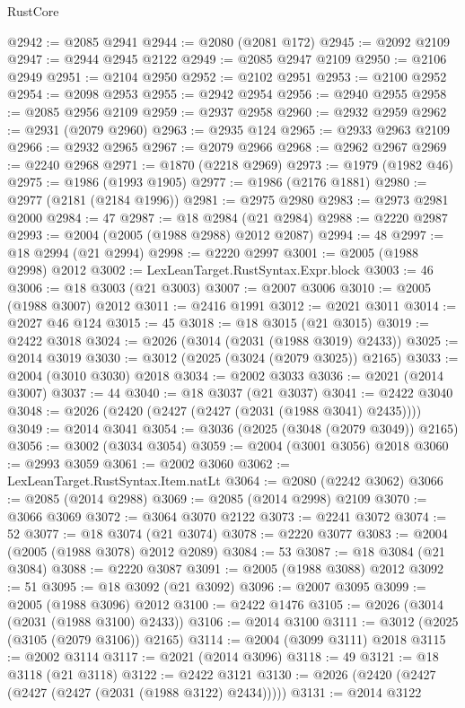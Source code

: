 \begin{lexlean}{RustCore}
\begin{coremodule}
@2942 := @2085 @2941
@2944 := @2080 (@2081 @172)
@2945 := @2092 @2109
@2947 := @2944 @2945 @2122
@2949 := @2085 @2947 @2109
@2950 := @2106 @2949
@2951 := @2104 @2950
@2952 := @2102 @2951
@2953 := @2100 @2952
@2954 := @2098 @2953
@2955 := @2942 @2954
@2956 := @2940 @2955
@2958 := @2085 @2956 @2109
@2959 := @2937 @2958
@2960 := @2932 @2959
@2962 := @2931 (@2079 @2960)
@2963 := @2935 @124
@2965 := @2933 @2963 @2109
@2966 := @2932 @2965
@2967 := @2079 @2966
@2968 := @2962 @2967
@2969 := @2240 @2968
@2971 := @1870 (@2218 @2969)
@2973 := @1979 (@1982 @46)
@2975 := @1986 (@1993 @1905)
@2977 := @1986 (@2176 @1881)
@2980 := @2977 (@2181 (@2184 @1996))
@2981 := @2975 @2980
@2983 := @2973 @2981 @2000
@2984 := 47
@2987 := @18 @2984 (@21 @2984)
@2988 := @2220 @2987
@2993 := @2004 (@2005 (@1988 @2988) @2012 @2087)
@2994 := 48
@2997 := @18 @2994 (@21 @2994)
@2998 := @2220 @2997
@3001 := @2005 (@1988 @2998) @2012
@3002 := LexLeanTarget.RustSyntax.Expr.block
@3003 := 46
@3006 := @18 @3003 (@21 @3003)
@3007 := @2007 @3006
@3010 := @2005 (@1988 @3007) @2012
@3011 := @2416 @1991
@3012 := @2021 @3011
@3014 := @2027 @46 @124
@3015 := 45
@3018 := @18 @3015 (@21 @3015)
@3019 := @2422 @3018
@3024 := @2026 (@3014 (@2031 (@1988 @3019) @2433))
@3025 := @2014 @3019
@3030 := @3012 (@2025 (@3024 (@2079 @3025)) @2165)
@3033 := @2004 (@3010 @3030) @2018
@3034 := @2002 @3033
@3036 := @2021 (@2014 @3007)
@3037 := 44
@3040 := @18 @3037 (@21 @3037)
@3041 := @2422 @3040
@3048 := @2026 (@2420 (@2427 (@2427 (@2031 (@1988 @3041) @2435))))
@3049 := @2014 @3041
@3054 := @3036 (@2025 (@3048 (@2079 @3049)) @2165)
@3056 := @3002 (@3034 @3054)
@3059 := @2004 (@3001 @3056) @2018
@3060 := @2993 @3059
@3061 := @2002 @3060
@3062 := LexLeanTarget.RustSyntax.Item.natLt
@3064 := @2080 (@2242 @3062)
@3066 := @2085 (@2014 @2988)
@3069 := @2085 (@2014 @2998) @2109
@3070 := @3066 @3069
@3072 := @3064 @3070 @2122
@3073 := @2241 @3072
@3074 := 52
@3077 := @18 @3074 (@21 @3074)
@3078 := @2220 @3077
@3083 := @2004 (@2005 (@1988 @3078) @2012 @2089)
@3084 := 53
@3087 := @18 @3084 (@21 @3084)
@3088 := @2220 @3087
@3091 := @2005 (@1988 @3088) @2012
@3092 := 51
@3095 := @18 @3092 (@21 @3092)
@3096 := @2007 @3095
@3099 := @2005 (@1988 @3096) @2012
@3100 := @2422 @1476
@3105 := @2026 (@3014 (@2031 (@1988 @3100) @2433))
@3106 := @2014 @3100
@3111 := @3012 (@2025 (@3105 (@2079 @3106)) @2165)
@3114 := @2004 (@3099 @3111) @2018
@3115 := @2002 @3114
@3117 := @2021 (@2014 @3096)
@3118 := 49
@3121 := @18 @3118 (@21 @3118)
@3122 := @2422 @3121
@3130 := @2026 (@2420 (@2427 (@2427 (@2427 (@2031 (@1988 @3122) @2434)))))
@3131 := @2014 @3122

\end{coremodule}
\end{lexlean}
